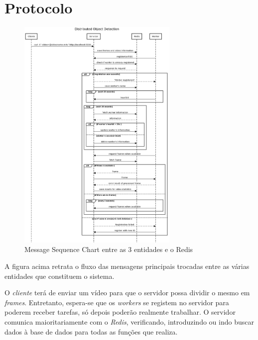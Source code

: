\documentclass[10pt,portuguese]{article}
\begin{document}
\section{Protocolo}
    \begin{figure}[!h]
        \centering
        \includegraphics[width=291]{Diagrama.png}
        \caption{Message Sequence Chart entre as 3 entidades e o Redis} 
    \end{figure}
\pagebreak
\par A figura acima retrata o fluxo das mensagens principais trocadas entre as várias entidades que constituem o sistema. 
\par O \textit{cliente} terá de enviar um vídeo para que o servidor possa dividir o mesmo em \textit{frames}. Entretanto, espera-se que os \textit{workers} se registem no servidor para poderem receber tarefas, só depois poderão realmente trabalhar. O servidor comunica maioritariamente com o \textit{Redis}, verificando, introduzindo ou indo buscar dados à base de dados para todas as funções que realiza. 
\end{document}
